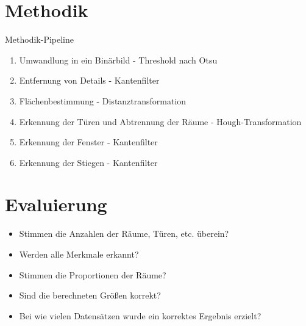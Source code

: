 \documentclass[deutsch]{scrartcl}
\begin{document}
\section{Methodik}
Methodik-Pipeline
\begin{enumerate}
	\item Umwandlung in ein Binärbild - Threshold nach Otsu
	\item Entfernung von Details - Kantenfilter
	\item Flächenbestimmung - Distanztransformation
	\item Erkennung der Türen und Abtrennung der Räume - Hough-Transformation
	\item Erkennung der Fenster - Kantenfilter
	\item Erkennung der Stiegen - Kantenfilter
\end{enumerate}

\section{Evaluierung}
\begin{itemize}
	\item Stimmen die Anzahlen der Räume, Türen, etc. überein?
	\item Werden alle Merkmale erkannt?
	\item Stimmen die Proportionen der Räume?
	\item Sind die berechneten Größen korrekt?
	\item Bei wie vielen Datensätzen wurde ein korrektes Ergebnis erzielt?

\end{itemize}
\end{document}
